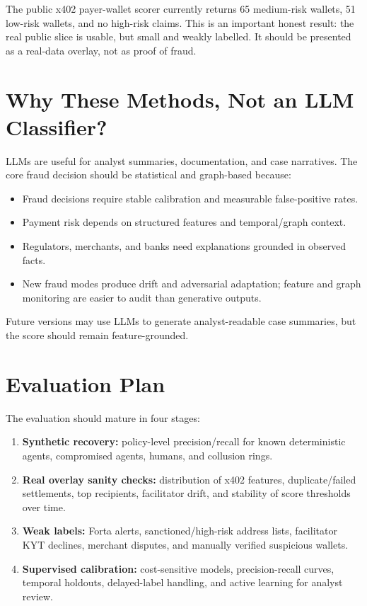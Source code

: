 \documentclass[11pt]{article}
\begin{document}
The public x402 payer-wallet scorer currently returns 65 medium-risk wallets,
51 low-risk wallets, and no high-risk claims.  This is an important honest
result: the real public slice is usable, but small and weakly labelled.  It
should be presented as a real-data overlay, not as proof of fraud.

\section{Why These Methods, Not an LLM Classifier?}

LLMs are useful for analyst summaries, documentation, and case narratives.  The
core fraud decision should be statistical and graph-based because:

\begin{itemize}
  \item Fraud decisions require stable calibration and measurable false-positive
        rates.
  \item Payment risk depends on structured features and temporal/graph context.
  \item Regulators, merchants, and banks need explanations grounded in observed
        facts.
  \item New fraud modes produce drift and adversarial adaptation; feature and
        graph monitoring are easier to audit than generative outputs.
\end{itemize}

Future versions may use LLMs to generate analyst-readable case summaries, but
the score should remain feature-grounded.

\section{Evaluation Plan}

The evaluation should mature in four stages:

\begin{enumerate}
  \item \textbf{Synthetic recovery:} policy-level precision/recall for known
        deterministic agents, compromised agents, humans, and collusion rings.
  \item \textbf{Real overlay sanity checks:} distribution of x402 features,
        duplicate/failed settlements, top recipients, facilitator drift, and
        stability of score thresholds over time.
  \item \textbf{Weak labels:} Forta alerts, sanctioned/high-risk address lists,
        facilitator KYT declines, merchant disputes, and manually verified
        suspicious wallets.
  \item \textbf{Supervised calibration:} cost-sensitive models, precision-recall
        curves, temporal holdouts, delayed-label handling, and active learning
        for analyst review.
\end{enumerate}
\end{document}
